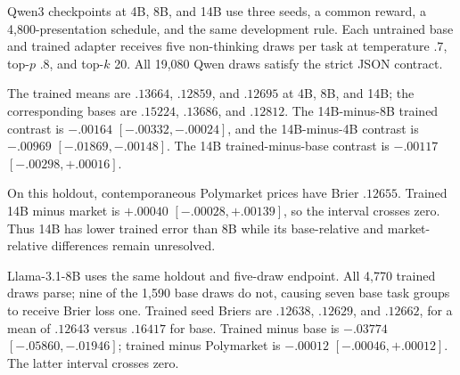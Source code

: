 Qwen3 checkpoints at 4B, 8B, and 14B use three seeds, a common reward, a
4,800-presentation schedule, and the same development rule. Each untrained base
and trained adapter receives five non-thinking draws per task at temperature
$.7$, top-$p$ $.8$, and top-$k$ 20. All 19,080 Qwen draws satisfy the strict JSON
contract.

\begin{center}
\begin{minipage}{.94\linewidth}
\centering
{}
\label{tab:exp4-qwen-scale-results}
\scriptsize
\setlength{\tabcolsep}{3.5pt}
\resizebox{\linewidth}{!}{}
\end{minipage}
\end{center}

The trained means are $.13664$, $.12859$, and $.12695$ at 4B, 8B, and 14B;
the corresponding bases are $.15224$, $.13686$, and $.12812$. The 14B-minus-8B
trained contrast is $-.00164$ $[-.00332,-.00024]$, and the 14B-minus-4B
contrast is $-.00969$ $[-.01869,-.00148]$. The 14B trained-minus-base contrast
is $-.00117$ $[-.00298,+.00016]$.

On this holdout, contemporaneous Polymarket prices have Brier $.12655$.
Trained 14B minus market is $+.00040$ $[-.00028,+.00139]$, so the interval
crosses zero. Thus 14B has lower trained error than 8B while its base-relative and
market-relative differences remain unresolved.

Llama-3.1-8B uses the same holdout and five-draw endpoint. All 4,770 trained draws
parse; nine of the 1,590 base draws do not, causing seven base task groups to
receive Brier loss one. Trained seed Briers are $.12638$, $.12629$, and
$.12662$, for a mean of $.12643$ versus $.16417$ for base. Trained minus base is
$-.03774$ $[-.05860,-.01946]$; trained minus Polymarket is
$-.00012$ $[-.00046,+.00012]$. The latter interval crosses zero.


